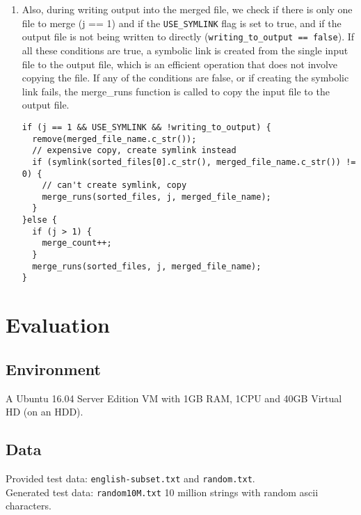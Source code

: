 \documentclass{article}
\begin{document}
\begin{itemize}
\begin{enumerate}[label=\star]
\begin{enumerate}
                            \item Also, during writing output into the merged file, we check if there is only one file to merge (j == 1) and if the \verb|USE_SYMLINK| flag is set to true, and if the output file is not being written to directly (\verb|writing_to_output == false|). If all these conditions are true, a symbolic link is created from the single input file to the output file, which is an efficient operation that does not involve copying the file. If any of the conditions are false, or if creating the symbolic link fails, the merge\_runs function is called to copy the input file to the output file. 
                            \begin{lstlisting}[style = cpp]
if (j == 1 && USE_SYMLINK && !writing_to_output) {
  remove(merged_file_name.c_str());
  // expensive copy, create symlink instead
  if (symlink(sorted_files[0].c_str(), merged_file_name.c_str()) != 0) {
    // can't create symlink, copy
    merge_runs(sorted_files, j, merged_file_name);
  }
}else {
  if (j > 1) {
    merge_count++;
  }
  merge_runs(sorted_files, j, merged_file_name);
}
                            \end{lstlisting}
                        \end{enumerate}
                \end{enumerate}
                                 
        \end{itemize}
\section{Evaluation}
\subsection{Environment}
A Ubuntu 16.04 Server Edition VM with 1GB RAM, 1CPU and 40GB Virtual HD (on an HDD).
\subsection{Data}
Provided test data: \verb|english-subset.txt| and \verb|random.txt|.\\
Generated test data: \verb|random10M.txt| 10 million strings with random ascii characters.
\end{document}
